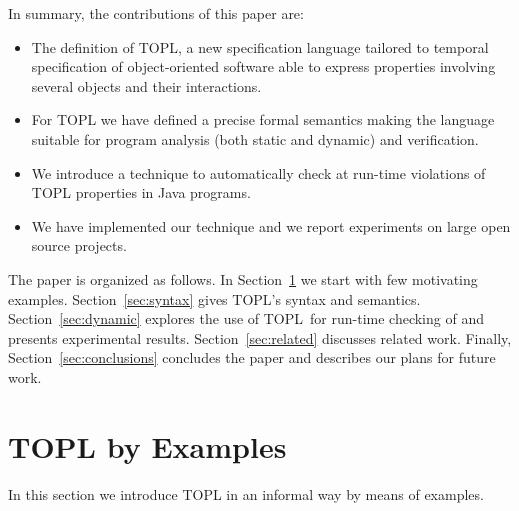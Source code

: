 \documentclass{llncs} %
\newcommand{\TPL}{TOPL}
\begin{document}
In summary, the contributions of this paper are:
\begin{itemize}
\item The definition of TOPL, a new specification language tailored 
to temporal specification of object-oriented software able to express properties involving several objects and their interactions.
\item For TOPL we have defined a precise formal semantics making the language suitable for program analysis (both static and dynamic) and verification. 
\item We introduce a technique to automatically check at run-time violations of TOPL properties in Java programs.
\item We have implemented our technique and we report experiments on large open source projects.
\end{itemize}

The paper is organized as follows. In Section~\ref{sec:examples} we start with few motivating examples.
Section~\ref{sec:syntax} gives  \TPL's syntax  and semantics.
Section~\ref{sec:dynamic} explores the use of \TPL \ for run-time checking of and presents experimental results. Section~\ref{sec:related} discusses related work.
Finally, Section~\ref{sec:conclusions} concludes the paper and describes our plans for future work.




\section{TOPL by Examples} \label{sec:examples} %
In this section we introduce TOPL in an informal way by means of examples.
\end{document}
